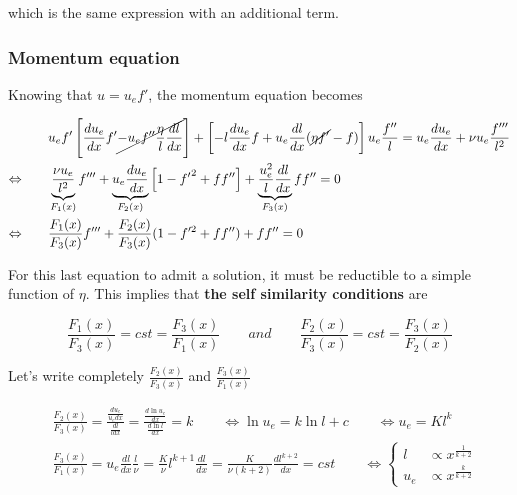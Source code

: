 			which is the same expression with an additional term. 
			
		\subsubsection{Momentum equation}
			Knowing that $u = u_e f'$, the momentum equation becomes
				
			\begin{equation}
			\begin{aligned}
				&u_ef' \left[ \frac{du_e}{dx}f' \cancel{- u_e f''\frac{\eta}{l}\frac{dl}{dx}} \right] + \left[-l \frac{du_e}{dx} f + u_e \frac{dl}{dx} (\cancel{\eta f'} - f)\right] u_e \frac{f''}{l} = u_e\frac{du_e}{dx} + \nu u_e \frac{f'''}{l^2}\\
				\Leftrightarrow \qquad &\underbrace{\frac{\nu u_e }{l^2}}_{F_1(x)}f''' + \underbrace{u_e \frac{du_e}{dx}}_{F_2(x)} \left[1 - {f'}^2 + ff'' \right] + \underbrace{ \frac{u_e^2}{l}\frac{dl}{dx}}_{F_3(x)}ff'' = 0 \\
				\Leftrightarrow \qquad &\frac{F_1(x)}{F_3(x)}f''' + \frac{F_2(x)}{F_3(x)}(1-f'^2+ff'') + ff''=0 
			\end{aligned}
			\label{eq:5.49}
			\end{equation}
			
			For this last equation to admit a solution, it must be reductible to a simple function of $\eta$. This implies that \textbf{the self similarity conditions} are
			
			\begin{equation}
				\frac{F_1(x)}{F_3(x)} = cst  =\frac{F_3(x)}{F_1(x)} \qquad and \qquad \frac{F_2(x)}{F_3(x)} = cst = \frac{F_3(x)}{F_2(x)}
			\end{equation}
			
			Let's write completely $\frac{F_2(x)}{F_3(x)}$ and $\frac{F_3(x)}{F_1(x)}$
			
			\begin{equation}
			\begin{aligned}
				&\frac{F_2(x)}{F_3(x)} =  \frac{\frac{du_e}{u_e dx}}{\frac{dl}{ldx}} = \frac{\frac{d\ln u_e}{dx}}{\frac{d \ln l}{dx}} = k \qquad \Leftrightarrow \ln u_e =k \ln l + c \qquad \Leftrightarrow u_e = K l ^k\\
				&\frac{F_3(x)}{F_1(x)} = u_e\frac{dl}{dx} \frac{l}{\nu } = \frac{K}{\nu}l^{k+1}\frac{dl}{dx} = \frac{K}{\nu (k+2)} \frac{dl^{k+2}}{dx} = cst \qquad \Leftrightarrow \left\{\begin{aligned} l &\propto x^{\frac{1}{k+2}}\\
				u_e &\propto x^{\frac{k}{k+2}} \end{aligned}\right.
			\end{aligned}
			\end{equation}
			
